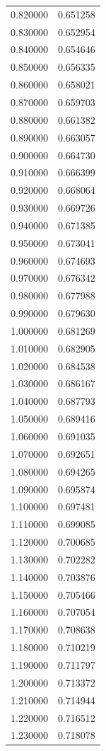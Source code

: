 \begin{tabular}{rr}
0.820000 & 0.651258 \\
0.830000 & 0.652954 \\
0.840000 & 0.654646 \\
0.850000 & 0.656335 \\
0.860000 & 0.658021 \\
0.870000 & 0.659703 \\
0.880000 & 0.661382 \\
0.890000 & 0.663057 \\
0.900000 & 0.664730 \\
0.910000 & 0.666399 \\
0.920000 & 0.668064 \\
0.930000 & 0.669726 \\
0.940000 & 0.671385 \\
0.950000 & 0.673041 \\
0.960000 & 0.674693 \\
0.970000 & 0.676342 \\
0.980000 & 0.677988 \\
0.990000 & 0.679630 \\
1.000000 & 0.681269 \\
1.010000 & 0.682905 \\
1.020000 & 0.684538 \\
1.030000 & 0.686167 \\
1.040000 & 0.687793 \\
1.050000 & 0.689416 \\
1.060000 & 0.691035 \\
1.070000 & 0.692651 \\
1.080000 & 0.694265 \\
1.090000 & 0.695874 \\
1.100000 & 0.697481 \\
1.110000 & 0.699085 \\
1.120000 & 0.700685 \\
1.130000 & 0.702282 \\
1.140000 & 0.703876 \\
1.150000 & 0.705466 \\
1.160000 & 0.707054 \\
1.170000 & 0.708638 \\
1.180000 & 0.710219 \\
1.190000 & 0.711797 \\
1.200000 & 0.713372 \\
1.210000 & 0.714944 \\
1.220000 & 0.716512 \\
1.230000 & 0.718078 \\

\end{tabular}
